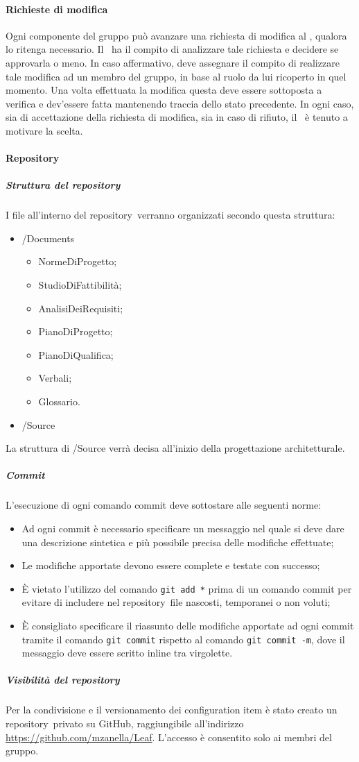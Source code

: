 \documentclass[../NormeProgetto.tex]{subfiles}
\begin{document}
	\paragraph{Richieste di modifica}
	Ogni componente del gruppo può avanzare una richiesta di modifica al \responsabilediprogetto, qualora lo ritenga necessario. Il \responsabilediprogetto\ ha il compito di analizzare tale richiesta e decidere se approvarla o meno. In caso affermativo, deve assegnare il compito di realizzare tale modifica ad un membro del gruppo, in base al ruolo da lui ricoperto in quel momento. Una volta effettuata la modifica questa deve essere sottoposta a verifica e dev'essere fatta mantenendo traccia dello stato precedente. In ogni caso, sia di accettazione della richiesta di modifica, sia in caso di rifiuto, il \responsabilediprogetto\ è tenuto a motivare la scelta.
	\paragraph{Repository}	
		\subparagraph{Struttura del repository}
	I file all'interno del repository\g\ verranno organizzati secondo questa struttura:
	\begin{itemize}
		\item /Documents
		\begin{itemize}
			\item NormeDiProgetto;
			\item StudioDiFattibilità;
			\item AnalisiDeiRequisiti;
			\item PianoDiProgetto;
			\item PianoDiQualifica;
			\item Verbali;
			\item Glossario.
		\end{itemize}
		\item /Source
	\end{itemize}
	La struttura di /Source verrà decisa all'inizio della progettazione architetturale.
		\subparagraph{Commit}
	L'esecuzione di ogni comando commit deve sottostare alle seguenti norme:
	\begin{itemize}
		\item Ad ogni commit è necessario specificare un messaggio nel quale si deve dare una descrizione sintetica e più possibile precisa delle modifiche effettuate;
		\item Le modifiche apportate devono essere complete e testate con successo;
		\item È vietato l'utilizzo del comando \texttt{git add *} prima di un comando commit per evitare di includere nel repository\g\ file nascosti, temporanei o non voluti;
		\item È consigliato specificare il riassunto delle modifiche apportate ad ogni commit tramite il comando \texttt{git commit} rispetto al comando \texttt{git commit -m}, dove il messaggio deve essere scritto inline tra virgolette.
	\end{itemize}
		\subparagraph{Visibilità del repository}
	Per la condivisione e il versionamento dei configuration item è stato creato un repository\g\ privato su GitHub\g, raggiungibile all'indirizzo \url{https://github.com/mzanella/Leaf}. L'accesso è consentito solo ai membri del gruppo.	
\end{document}
